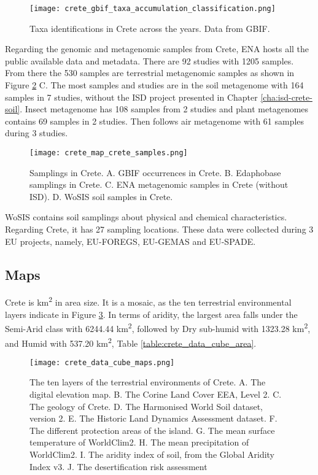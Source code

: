 \begin{figure}[hbt!] 
    \centering\texttt{[image: crete\_gbif\_taxa\_accumulation\_classification.png]}
    \caption{Taxa identifications in Crete across the years. Data from GBIF.}
    \label{fig:crete_taxa_gbif}
\end{figure}

Regarding the genomic and metagenomic samples from Crete, ENA hosts all the public 
available data and metadata. There are 92 studies with 1205 samples.
From there the 530 samples are terrestrial metagenomic samples as shown in
Figure \ref{fig:crete-samplings} C. 
The most samples and studies are in the soil metagenome with 164 samples in 7 studies, without the
ISD project presented in Chapter \ref{cha:isd-crete-soil}.
Insect metagenome has 108 samples from 2 studies
and plant metagenomes contains 69 samples in 2 studies.
Then follows air metagenome with 61 samples during 3 studies.

\begin{figure}[hbt!] 
    \centering\texttt{[image: crete\_map\_crete\_samples.png]}
    \caption[Samplings in Crete]{Samplings in Crete. A. GBIF occurrences in Crete.
    B. Edaphobase samplings in Crete. C. ENA metagenomic samples in Crete (without ISD). D. WoSIS soil samples in Crete.}
    \label{fig:crete-samplings}
\end{figure}

WoSIS contains soil samplings about physical and chemical characteristics. Regarding 
Crete, it has 27 sampling locations. These data were collected during 3 EU projects, namely,
EU-FOREGS, EU-GEMAS and EU-SPADE.

\subsection{Maps}

Crete is km\textsuperscript{2} in area size. It is a mosaic, as the ten
terrestrial environmental layers indicate in Figure \ref{fig:crete_data_cube_map}.
In terms of aridity, the largest area falls under the Semi-Arid class with 6244.44 km\textsuperscript{2},
followed by Dry sub-humid with 1323.28 km\textsuperscript{2}, and Humid with 537.20 km\textsuperscript{2}, Table \ref{table:crete_data_cube_area}.

\begin{figure}[hbt!] 
    \centering\texttt{[image: crete\_data\_cube\_maps.png]}
    \caption[Crete data cube]{The ten layers of the terrestrial environments of Crete.
    A. The digital elevation map. B. The Corine Land Cover EEA, Level 2.
    C. The geology of Crete. D. The Harmonised World Soil dataset, version 2.
    E. The Historic Land Dynamics Assessment dataset. F. The different protection areas of the island.
    G. The mean surface temperature of WorldClim2. H. The mean precipitation of  WorldClim2.
    I. The aridity index of soil, from the Global Aridity Index v3. J. The desertification risk assessment}
    \label{fig:crete_data_cube_map}
\end{figure}

